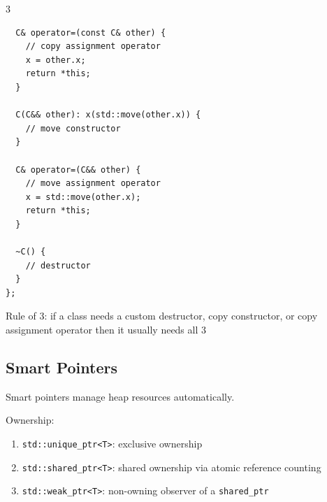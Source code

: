 \documentclass[12pt, a4paper]{article}
\begin{document}
\begin{multicols*}{3}
\begin{lstlisting}
  C& operator=(const C& other) {
    // copy assignment operator
    x = other.x;
    return *this;
  }

  C(C&& other): x(std::move(other.x)) {
    // move constructor
  }

  C& operator=(C&& other) {
    // move assignment operator
    x = std::move(other.x);
    return *this;
  }

  ~C() {
    // destructor
  }
};
\end{lstlisting}

Rule of 3: if a class needs a custom destructor, copy constructor, or copy assignment operator then it usually needs all 3

\colbreak
\subsection{Smart Pointers}

Smart pointers manage heap resources automatically.

Ownership:
\begin{enumerate}[\roman*.]
  \item \lstinline|std::unique_ptr<T>|: exclusive ownership
  \item \lstinline|std::shared_ptr<T>|: shared ownership via atomic reference counting
  \item \lstinline|std::weak_ptr<T>|: non-owning observer of a \lstinline|shared_ptr|
\end{enumerate}


\end{multicols*}
\end{document}
